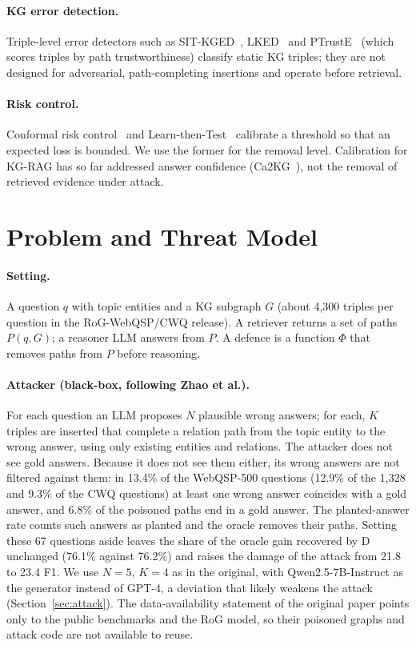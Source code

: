 \documentclass[preprint,12pt]{elsarticle}
\begin{document}
\paragraph{KG error detection.} Triple-level error detectors such as SIT-KGED~\cite{sitkged2026}, LKED~\cite{lked2026} and PTrustE~\cite{ptruste2022} (which scores triples by path trustworthiness) classify static KG triples; they are not designed for adversarial, path-completing insertions and operate before retrieval.

\paragraph{Risk control.} Conformal risk control~\cite{angelopoulos2024} and Learn-then-Test~\cite{angelopoulos2021} calibrate a threshold so that an expected loss is bounded. We use the former for the removal level. Calibration for KG-RAG has so far addressed answer confidence (Ca2KG~\cite{ren2026ca2kg}), not the removal of retrieved evidence under attack.

\section{Problem and Threat Model}\label{sec:threat}
\paragraph{Setting.} A question $q$ with topic entities and a KG subgraph $G$ (about 4{,}300 triples per question in the RoG-WebQSP/CWQ release). A retriever returns a set of paths $P(q,G)$; a reasoner LLM answers from $P$. A defence is a function $\Phi$ that removes paths from $P$ before reasoning.

\paragraph{Attacker (black-box, following Zhao et al.).} For each question an LLM proposes $N$ plausible wrong answers; for each, $K$ triples are inserted that complete a relation path from the topic entity to the wrong answer, using only existing entities and relations. The attacker does not see gold answers. Because it does not see them either, its wrong answers are not filtered against them: in 13.4\% of the WebQSP-500 questions (12.9\% of the 1,328 and 9.3\% of the CWQ questions) at least one wrong answer coincides with a gold answer, and 6.8\% of the poisoned paths end in a gold answer. The planted-answer rate counts such answers as planted and the oracle removes their paths. Setting these 67 questions aside leaves the share of the oracle gain recovered by D unchanged (76.1\% against 76.2\%) and raises the damage of the attack from 21.8 to 23.4 F1. We use $N=5$, $K=4$ as in the original, with Qwen2.5-7B-Instruct as the generator instead of GPT-4, a deviation that likely weakens the attack (Section~\ref{sec:attack}). The data-availability statement of the original paper points only to the public benchmarks and the RoG model, so their poisoned graphs and attack code are not available to reuse.
\end{document}
